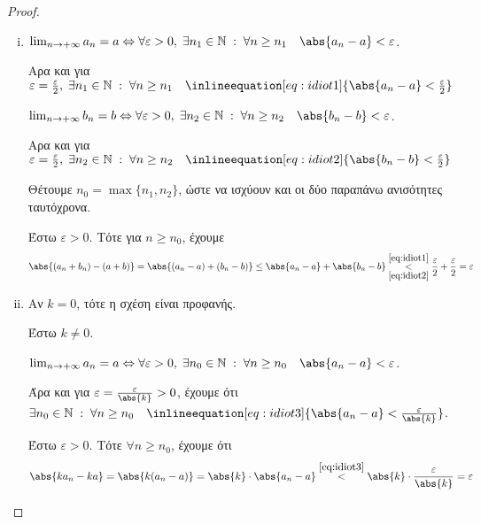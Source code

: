 \documentclass[main.tex]{subfiles}
\begin{document}
\begin{proof}
\item {}
  \begin{enumerate}[i)]
    \item $ \lim_{n \to +\infty} a_{n} = a \Leftrightarrow \forall 
      \varepsilon > 0, \; \exists n_{1} \in \mathbb{N} \; : \; 
      \forall n \geq n_{1} \quad \abs{a_{n}-a} < \varepsilon$.

      Αρα και για $ \varepsilon = \frac{\varepsilon}{ 2}, \; 
      \exists n_{1} \in \mathbb{N} \; : \; \forall n \geq n_{1} 
      \quad \inlineequation[eq:idiot1]{\abs{a_{n}-a} <
      \frac{\varepsilon}{2}} $

      $ \lim_{n \to +\infty} b_{n} = b \Leftrightarrow \forall 
      \varepsilon > 0, \; \exists n_{2} \in \mathbb{N} \; : \; 
      \forall n \geq n_{2} \quad \abs{b_{n}-b} < \varepsilon$.

      Αρα και για $ \varepsilon = \frac{\varepsilon}{ 2}, \; 
      \exists n_{2} \in \mathbb{N} \; : \; \forall n \geq n_{2} 
      \quad \inlineequation[eq:idiot2]{\abs{b_{n}-b} <
      \frac{\varepsilon}{2}} $

      Θέτουμε $ n_{0}= \max \{ n_{1}, n_{2} \} $, ώστε να ισχύουν 
      και οι δύο παραπάνω ανισότητες ταυτόχρονα.

      Έστω $ \varepsilon >0 $. Τότε για $ n \geq n_{0} $, έχουμε 
      \[
        \abs{(a_{n}+ b_{n}) - (a+b)} = \abs{(a_{n}- a) + 
        (b_{n}-b)} \leq \abs{a_{n}- a} + \abs{b_{n}-b} 
        \overset{\eqref{eq:idiot1}}
        {\underset{\eqref{eq:idiot2}}{<}} 
        \frac{\varepsilon }{2} + \frac{\varepsilon}{ 2} = 
        \varepsilon
      \] 

    \item 
      Αν $ k=0 $, τότε η σχέση είναι προφανής.

      Έστω $ k \neq 0 $. 

      $ \lim_{n \to +\infty} a_{n} = a \Leftrightarrow \forall 
      \varepsilon >0, \; \exists 
      n_{0} \in \mathbb{N} \; : \; \forall n \geq n_{0} \quad 
      \abs{a_{n}- a} < \varepsilon$. 

      Άρα και για $ \varepsilon = \frac{\varepsilon}{\abs{k}} >0$,
      έχουμε ότι $ \exists n_{0} \in \mathbb{N} \; : \; 
      \forall n \geq n_{0} \quad \inlineequation[eq:idiot3]
      {\abs{a_{n}- a} < \frac{\varepsilon}{\abs{k}}}$. 

      Έστω $ \varepsilon >0 $. Τότε $ \forall n \geq n_{0} $, 
      έχουμε ότι 
      \[
        \abs{k a_{n}- ka} = \abs{k(a_{n}- a)} = \abs{k} \cdot 
        \abs{a_{n}- a} \overset{\eqref{eq:idiot3}}{<} \abs{k}
        \cdot \frac{\varepsilon}{\abs{k}} = \varepsilon 
      \] 


\end{enumerate}
\end{proof}
\end{document}
